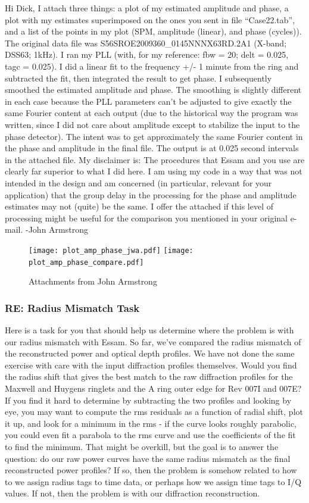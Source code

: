 \documentclass[crop=false,class=book]{standalone}
\begin{document}
Hi Dick, I attach three things:  a plot of my estimated amplitude and phase, a plot with my estimates superimposed on the ones you sent in file “Case22.tab”, and a list of the points in my plot (SPM, amplitude (linear), and phase (cycles)).  The original data file was S56SROE2009360\_0145NNNX63RD.2A1 (X-band; DSS63; 1kHz). I ran my PLL (with, for my reference: fbw = 20; delt = 0.025, tagc = 0.025). I did a linear fit to the frequency +/- 1 minute from the ring and subtracted the fit, then integrated the result to get phase.  I subsequently smoothed the estimated amplitude and phase.  The smoothing is slightly different in each case because the PLL parameters can’t be adjusted to give exactly the same Fourier content at each output (due to the historical way the program was written, since I did not care about amplitude except to stabilize the input to the phase detector).   The intent was to get approximately the same Fourier content in the phase and amplitude in the final file. The output is at 0.025 second intervals in the attached file. My disclaimer is:  The procedures that Essam and you use are clearly far superior to what I did here.  I am using my code in a way that was not intended in the design and am concerned (in particular, relevant for your application) that the group delay in the processing for the phase and amplitude estimates may not (quite) be the same.  I offer the attached if this level of processing might be useful for the comparison you mentioned in your original e-mail. -John Armstrong
\begin{figure}[H]
    \centering
    \texttt{[image: plot\_amp\_phase\_jwa.pdf]}
    \hfill
    \texttt{[image: plot\_amp\_phase\_compare.pdf]}
    \caption{Attachments from John Armstrong}
\end{figure}
\subsubsection{\footnotesize RE: Radius Mismatch Task}
Here is a task for you that should help us determine where the problem is with our radius mismatch with Essam. So far, we've compared the radius mismatch of the reconstructed power and optical depth profiles. We have not done the same exercise with care with the input diffraction profiles themselves. Would you find the radius shift that gives the best match to the raw diffraction profiles for the Maxwell and Huygens ringlets and the A ring outer edge for Rev 007I and 007E? If you find it hard to determine by subtracting the two profiles and looking by eye, you may want to compute the rms residuals as a function of radial shift, plot it up, and look for a minimum in the rms - if the curve looks roughly parabolic, you could even fit a parabola to the rms curve and use the coefficients of the fit to find the minimum. That might be overkill, but the goal is to answer the question: do our raw power curves have the same radius mismatch as the final reconstructed power profiles? If so, then the problem is somehow related to how to we assign radius tags to time data, or perhaps how we assign time tags to I/Q values. If not, then the problem is with our diffraction reconstruction. 
\end{document}
